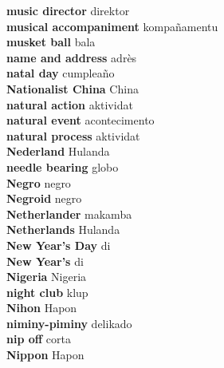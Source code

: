 \textbf{ music director  } direktor \\
\textbf{ musical accompaniment  } kompañamentu \\
\textbf{ musket ball  } bala \\
\textbf{ name and address  } adrès \\
\textbf{ natal day  } cumpleaño \\
\textbf{ Nationalist China  } China \\
\textbf{ natural action  } aktividat \\
\textbf{ natural event  } acontecimento \\
\textbf{ natural process  } aktividat \\
\textbf{ Nederland  } Hulanda \\
\textbf{ needle bearing  } globo \\
\textbf{ Negro  } negro \\
\textbf{ Negroid  } negro \\
\textbf{ Netherlander  } makamba \\
\textbf{ Netherlands  } Hulanda \\
\textbf{ New Year’s Day  } di \\
\textbf{ New Year’s  } di \\
\textbf{ Nigeria  } Nigeria \\
\textbf{ night club  } klup \\
\textbf{ Nihon  } Hapon \\
\textbf{ niminy-piminy  } delikado \\
\textbf{ nip off  } corta \\
\textbf{ Nippon  } Hapon \\
